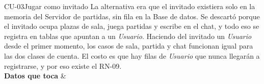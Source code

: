 \begin{fichacu}{CU-03}{Jugar como invitado}
{    La alternativa era que el invitado existiera solo en la memoria del Servidor de partidas, sin fila en la Base de datos. Se descartó porque el invitado ocupa plazas de sala, juega partidas y escribe en el chat, y todo eso se registra en tablas que apuntan a un \textit{Usuario}. Haciendo del invitado un \textit{Usuario} desde el primer momento, los casos de sala, partida y chat funcionan igual para las dos clases de cuenta. El costo es que hay filas de \textit{Usuario} que nunca llegarán a registrarse, y por eso existe el \mbox{RN-09}.} \\ \hline
  \textbf{Datos que toca} &  \\ \hline
\end{fichacu}
\clearpage
